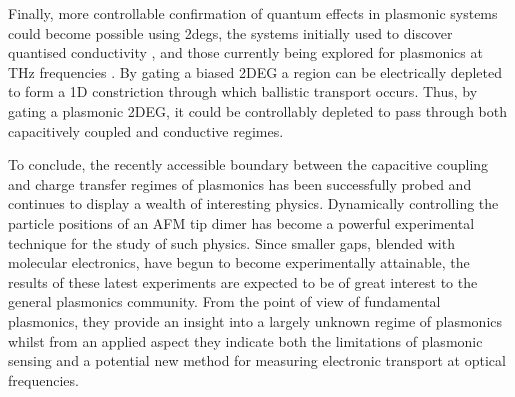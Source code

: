 \documentclass[12pt, a4paper, oneside]{book}
\begin{document}
Finally, more controllable confirmation of quantum effects in plasmonic systems could become possible using \glspl{2deg}, the systems initially used to discover quantised conductivity \cite{van1988quantized, wharam1988one}, and those currently being explored for plasmonics at THz frequencies \cite{koppens2011graphene, christensen2011graphene, chen2012optical}. By gating a biased 2DEG a region can be electrically depleted to form a 1D constriction through which ballistic transport occurs. Thus, by gating a plasmonic 2DEG, it could be controllably depleted to pass through both capacitively coupled and conductive regimes.

To conclude, the recently accessible boundary between the capacitive coupling and charge transfer regimes of plasmonics has been successfully probed and continues to display a wealth of interesting physics. Dynamically controlling the particle positions of an AFM tip dimer has become a powerful experimental technique for the study of such physics. Since smaller gaps, blended with molecular electronics, have begun to become experimentally attainable, the results of these latest experiments are expected to be of great interest to the general plasmonics community. From the point of view of fundamental plasmonics, they provide an insight into a largely unknown regime of plasmonics whilst from an applied aspect they indicate both the limitations of plasmonic sensing and a potential new method for measuring electronic transport at optical frequencies.

\ifstandalone
\begin{singlespace}
\fontsize{8pt}{1em}\selectfont
\printbibliography[notcategory=fullcited]
\end{singlespace}
\fi
\end{document}

